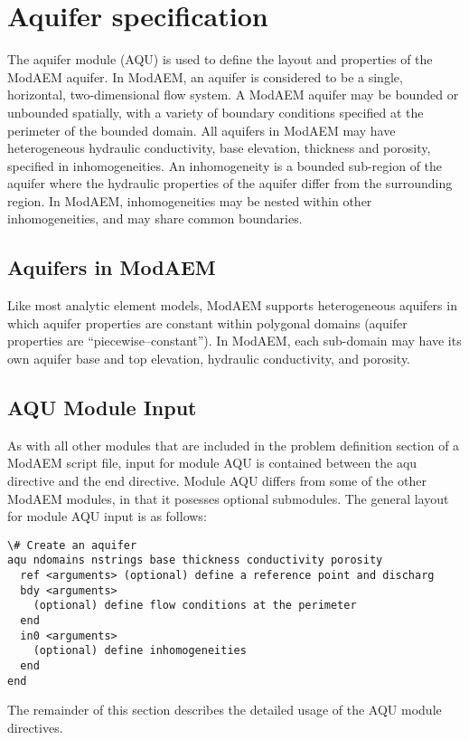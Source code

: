 \chapter{Aquifer specification\label{cha:aqu-module}}

The aquifer module (AQU) is used to define the layout and properties of the ModAEM aquifer. In ModAEM, an aquifer is considered to be a single, horizontal, two-dimensional flow system. A ModAEM aquifer may be bounded or unbounded spatially, with a variety of boundary conditions specified at the perimeter of the bounded domain. All aquifers in ModAEM may have heterogeneous hydraulic conductivity, base elevation, thickness and porosity, specified in inhomogeneities. An inhomogeneity is a bounded sub-region of the aquifer where the hydraulic properties of the aquifer differ from the surrounding region. In ModAEM, inhomogeneities may be nested within other inhomogeneities, and may share common boundaries.

\section{Aquifers in ModAEM}

Like most analytic element models, ModAEM supports heterogeneous aquifers in which aquifer properties are constant within polygonal domains (aquifer properties are ``piecewise--constant''). In ModAEM, each sub-domain may have its own aquifer base and top elevation, hydraulic conductivity, and porosity.

\section{AQU Module Input }

As with all other modules that are included in the problem definition section of a ModAEM script file, input for module AQU is contained between the \textsf{aqu} directive and the \textsf{end} directive. Module AQU differs from some of the other ModAEM modules, in that it posesses optional submodules. The general layout for module AQU input is as follows:
\begin{verbatim}
\# Create an aquifer
aqu ndomains nstrings base thickness conductivity porosity
  ref <arguments> (optional) define a reference point and discharg
  bdy <arguments>
    (optional) define flow conditions at the perimeter 
  end 
  in0 <arguments>
    (optional) define inhomogeneities 
  end
end
\end{verbatim}
The remainder of this section describes the detailed usage of the
AQU module directives.

